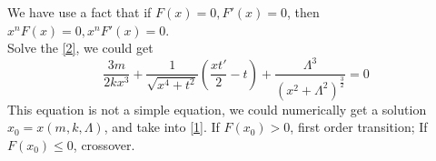 \documentclass{article}
\begin{document}
    We have use a fact that if $F(x)=0, F'(x)=0$, then $x^nF(x)=0, x^nF'(x)=0$.\\
Solve the \autoref{2}, we could get
\begin{equation}
        \frac{3m}{2kx^3}+\frac{1}{\sqrt{x^4+t^2}}(\frac{xt'}{2}-t)+\frac{\Lambda^3}{(x^2+\Lambda^2)^\frac{3}{2}}= 0
\end{equation}
This equation is not a simple equation, we could numerically get a solution $x_0=x(m,k,\Lambda)$, and take into \autoref{1}. If $F(x_0)>0$, first order transition; If $F(x_0)\leq 0$, crossover.\\
\end{document}
